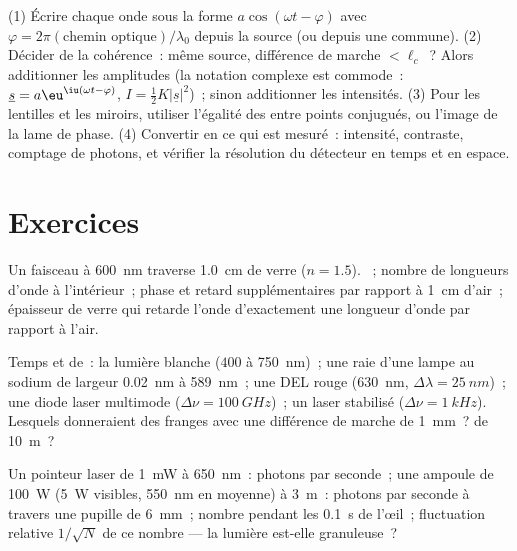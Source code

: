 \begin{method}\label{met:b2:scalar-light-model:method}
(1) Écrire chaque onde sous la forme $a\cos(\omega t - \varphi)$ avec $\varphi = 2\pi(\text{chemin
optique})/\lambda_0$ depuis la source (ou depuis une  commune). (2) Décider de
la cohérence~: même source, différence de marche $< \ell_c$~? Alors additionner les amplitudes
(la notation complexe est commode~: $\underline s = a\eu^{\iu(\omega t - \varphi)}$, $I =
\tfrac12K|\underline s|^2$)~; sinon additionner les intensités. (3) Pour les lentilles et les
miroirs, utiliser l'égalité des  entre points conjugués, ou l'image de
la lame de phase. (4) Convertir en ce qui est mesuré~: intensité,
contraste, comptage de photons, et vérifier la résolution du détecteur en temps
et en espace.
\end{method}

\section{Exercices}

\begin{exercise}[$\star$]\label{exo:b2:scalar-light-model:1}
Un faisceau à \qty{600}{nm} traverse \qty{1.0}{cm} de verre ($n = 1.5$). ~; nombre de longueurs d'onde à l'intérieur~; phase et retard supplémentaires
par rapport à \qty{1}{cm} d'air~; épaisseur de verre qui retarde
l'onde d'exactement une longueur d'onde par rapport à l'air.
\end{exercise}

\begin{exercise}[$\star$]\label{exo:b2:scalar-light-model:2}
Temps et  de~: la lumière blanche ($400$ à \qty{750}{nm})~; une raie
d'une lampe au sodium de largeur \qty{0.02}{nm} à \qty{589}{nm}~; une DEL rouge (\qty{630}{nm},
$\Delta\lambda = \qty{25}{nm}$)~; une diode laser multimode ($\Delta\nu = \qty{100}{GHz}$)~; un
laser stabilisé ($\Delta\nu = \qty{1}{kHz}$). Lesquels donneraient des franges avec une
différence de marche de \qty{1}{mm}~? de \qty{10}{m}~?
\end{exercise}

\begin{exercise}[$\star$]\label{exo:b2:scalar-light-model:3}
Un pointeur laser de \qty{1}{mW} à \qty{650}{nm}~: photons par seconde~; une
ampoule de \qty{100}{W} (\qty{5}{W} visibles, \qty{550}{nm} en moyenne) à \qty{3}{m}~: photons par
seconde à travers une pupille de \qty{6}{mm}~; nombre pendant les \qty{0.1}{s} de l'œil~;
fluctuation relative $1/\sqrt N$ de ce nombre --- la lumière est-elle granuleuse~?
\end{exercise}

